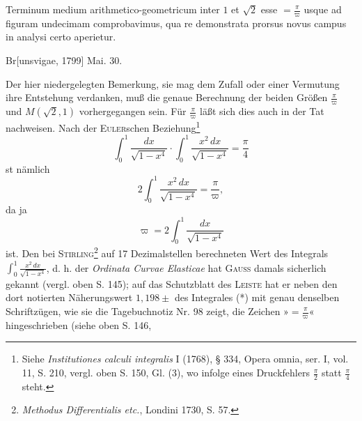 \indent Terminum medium arithmetico-geometricum inter \(1\) et \(\surd2\) esse \(=\frac\pi\varpi\) usque ad figuram undecimam comprobavimus, qua re demonstrata prorsus novus campus in analysi certo aperietur.
\par\noindent\hfill Br[unsvigae, 1799] Mai. 30.

\medskip\begingroup\small
\makeatletter\tagsleft@true\let\veqno\@@leqno\makeatother
\renewcommand{\thefootnote}{**)}
\indent Der hier niedergelegten Bemerkung, sie mag dem Zufall oder einer Vermutung ihre Entstehung verdanken, muß die genaue Berechnung der beiden Größen \(\frac\pi\varpi\) und \(M(\sqrt2,1)\) vorhergegangen sein. Für \(\frac\pi\varpi\) läßt sich dies auch in der Tat nachweisen. Nach der \textsc{Euler}schen Beziehung\footnote{Siehe \textit{Institutiones calculi integralis} I (1768), § 334, Opera omnia, ser. I, vol. 11, S. 210, vergl. oben S. 150, Gl. (3), wo infolge eines Druckfehlers \(\frac\pi2\) statt \(\frac\pi4\) steht.}
\[
\int_0^1\frac{dx}{\sqrt{1-x^4}}\cdot\int_0^1\frac{x^2\,dx}{\sqrt{1-x^4}}=\frac\pi4
\]
\noindent st nämlich
\begin{equation*}
\tag*{(*)}2\int_0^1\frac{x^2\,dx}{\sqrt{1-x^4}}=\frac\pi\varpi,
\end{equation*}
\noindent da ja
\[
\varpi=2\int_0^1\frac{dx}{\sqrt{1-x^4}}
\]
\renewcommand{\thefootnote}{***)}
\noindent ist. Den bei \textsc{Stirling}\footnote{\textit{Methodus Differentialis etc.}, Londini 1730, S. 57.} auf 17 Dezimalstellen berechneten Wert des Integrals \(\displaystyle\int_0^1\frac{x^2\,dx}{\sqrt{1-x^4}}\), d. h. der \textit{Ordinata Curvae Elasticae} hat \textsc{Gauss} damals sicherlich gekannt (vergl. oben S. 145); auf das Schutzblatt des \textsc{Leiste} hat er neben den dort notierten Näherungswert \(1{,}198\pm\) des Integrales (*) mit genau denselben Schriftzügen, wie sie die Tagebuchnotiz Nr. 98 zeigt, die Zeichen »\(=\frac\pi\varpi\)« hingeschrieben (siehe oben S. 146,
\par\endgroup

